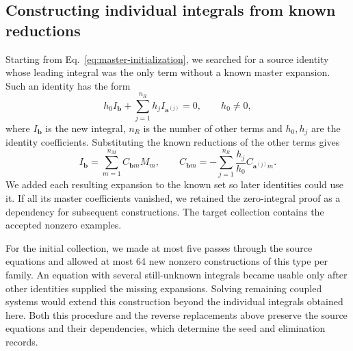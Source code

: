 \documentclass[11pt,a4paper]{article}
\begin{document}
\subsection{Constructing individual integrals from known reductions}
Starting from Eq.~\eqref{eq:master-initialization}, we searched for a
source identity whose leading integral was the only term without a
known master expansion. Such an identity has the form
\begin{equation}
 h_0 I_{\boldsymbol b}
 +\sum_{j=1}^{n_R}h_j I_{\boldsymbol a^{(j)}}=0,
 \qquad h_0\ne0,
 \label{eq:generation-identity}
\end{equation}
where $I_{\boldsymbol b}$ is the new integral, $n_R$ is the number
of other terms and $h_0,h_j$ are the identity coefficients.
Substituting the known reductions of the other terms gives
\begin{equation}
 I_{\boldsymbol b}
 =\sum_{m=1}^{n_M}C_{\boldsymbol b m}M_m,
 \qquad
 C_{\boldsymbol b m}
 =-\sum_{j=1}^{n_R}\frac{h_j}{h_0}
                    C_{\boldsymbol a^{(j)}m}.
 \label{eq:generated-integral-reduction}
\end{equation}
We added each resulting expansion to the known set so later identities
could use it. If all its master coefficients vanished, we retained the
zero-integral proof as a dependency for subsequent constructions.
The target collection contains the accepted nonzero examples.

For the initial collection, we made at most five passes through the
source equations and allowed at most 64 new nonzero constructions
of this type per family.
An equation with several still-unknown integrals became usable only
after other identities supplied the missing expansions. Solving
remaining coupled systems would extend this construction beyond the
individual integrals obtained here. Both this procedure and the
reverse replacements above preserve the source equations and their
dependencies, which determine the seed and elimination records.
\end{document}

